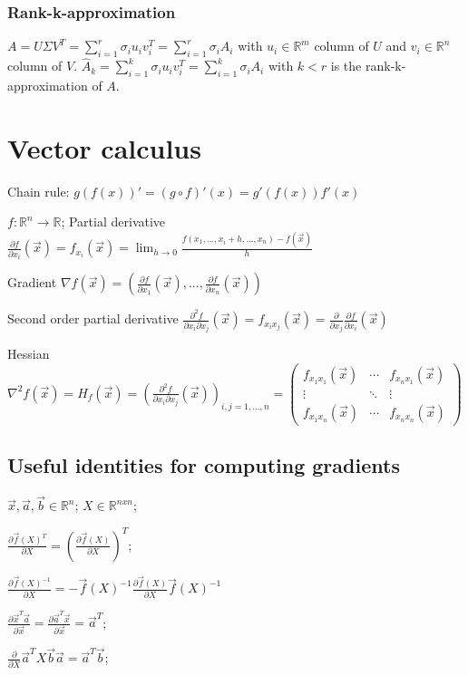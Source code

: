 \documentclass[]{article}
\newcommand{\cfi}[1]{f_{x_{#1}}(\vec{x})}
\newcommand{\pfi}[1]{\frac{\partial f}{\partial x_{#1}}(\vec{x})}
\newcommand{\scfi}[2]{f_{x_{#1}x_{#2}}(\vec{x})}
\newcommand{\spfi}[2]{\frac{\partial^2 f}{\partial x_{#1} \partial x_{#2}}(\vec{x})}
\begin{document}
	\subsubsection{Rank-k-approximation}
	$A = U \Sigma V^T = \sum_{i=1}^{r} \sigma_i u_i v_i^T = \sum_{i=1}^r \sigma_i A_i$ with $u_i \in \mathbb{R}^m$ column of $U$ and $v_i \in \mathbb{R}^n$ column of $V$.
	$\hat{A}_k = \sum_{i=1}^k \sigma_i u_i v_i^T = \sum_{i=1}^k \sigma_i A_i$ with $k < r$ is the rank-k-approximation of $A$.
	
	\section{Vector calculus}
	
	Chain rule: $g(f(x))' = (g \circ f)'(x) = g'(f(x)) f'(x)$
	
	$f : \mathbb{R}^n \to \mathbb{R}$; 
	Partial derivative $\pfi{i}=\cfi{i}=\lim_{h\to 0}{\frac{f(x_{1},...,x_{i}+h,...,x_{n})-f(\vec{x})}{h}}$
	
	Gradient $\nabla f(\vec{x}) = \left(\pfi{1},...,\pfi{n}\right)$

	Second order partial derivative $\spfi{i}{j}=\scfi{i}{j}=\frac{\partial}{\partial x_{j}}\pfi{i}$
	
	Hessian $\nabla^2 f(\vec{x}) = H_{f}(\vec{x})=\left(\spfi{i}{j}\right)_{i,j=1,...,n} = \begin{pmatrix}
		\scfi{1}{1} & \cdots & \scfi{n}{1} \\
		\vdots & \ddots & \vdots \\
		\scfi{1}{n} & \cdots & \scfi{n}{n}
	\end{pmatrix}$

	\subsection{Useful identities for computing gradients}
	
	$\vec{x}, \vec{a}, \vec{b} \in \mathbb{R}^{n}$;
	$X \in \mathbb{R}^{nxn}$;
	
	$\frac{\partial \vec{f}(X)^T}{\partial X} = \left(\frac{\partial \vec{f}(X)}{\partial X}\right)^T$;
	
	$\frac{\partial \vec{f}(X)^{-1}}{\partial X}  = - \vec{f}(X)^{-1} \frac{\partial \vec{f}(X)}{\partial X} \vec{f}(X)^{-1}$
	
	$\frac{\partial \vec{x}^T \vec{a}}{\partial \vec{x}} = \frac{\partial \vec{a}^T \vec{x}}{\partial \vec{x}} = \vec{a}^T$;
	
	$\frac{\partial}{\partial X} \vec{a}^T X \vec{b} \vec{a} = \vec{a}^T \vec{b}$;
	
\end{document}
